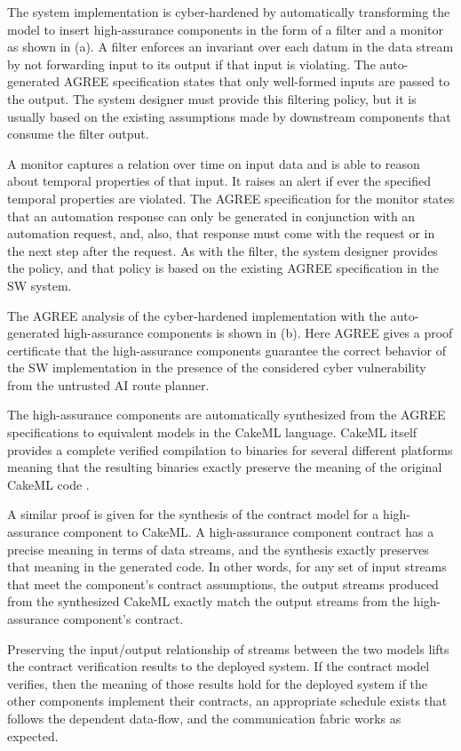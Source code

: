 The system implementation is cyber-hardened by automatically transforming the model to insert high-assurance components in the form of a filter and a monitor as shown in (a). A filter enforces an invariant over each datum in the data stream by not forwarding input to its output if that input is violating. The auto-generated AGREE specification states that only well-formed inputs are passed to the output. The system designer must provide this filtering policy, but it is usually based on the existing assumptions made by downstream components that consume the filter output. 

A monitor captures a relation over time on input data and is able to reason about temporal properties of that input. It raises an alert if ever the specified temporal properties are violated. The AGREE specification for the monitor states that an automation response can only be generated in conjunction with an automation request, and, also,  that response must come with the request or in the next step after the request. As with the filter, the system designer provides the policy, and that policy is based on the existing AGREE specification in the SW system.

The AGREE analysis of the cyber-hardened implementation with the auto-generated high-assurance components is shown in (b). Here AGREE gives a proof certificate that the high-assurance components guarantee the correct behavior of the SW implementation in the presence of the considered cyber vulnerability from the untrusted AI route planner.

The high-assurance components are automatically synthesized from the AGREE specifications to equivalent models in the CakeML language. CakeML itself provides a complete verified compilation to binaries for several different platforms meaning that the resulting binaries exactly preserve the meaning of the original CakeML code \cite{cakeml}. 

A similar proof is given for the synthesis of the contract model for a high-assurance component to CakeML. A high-assurance component contract has a precise meaning in terms of data streams, and the synthesis exactly preserves that meaning in the generated code. In other words, for any set of input streams that meet the component's contract assumptions, the output streams produced from the synthesized CakeML exactly match the output streams from the high-assurance component's contract. 

Preserving the input/output relationship of streams between the two models lifts the contract verification results to the deployed system. If the contract model verifies, then the meaning of those results hold for the deployed system if the other components implement their contracts, an appropriate schedule exists that follows the dependent data-flow, and the communication fabric works as expected.